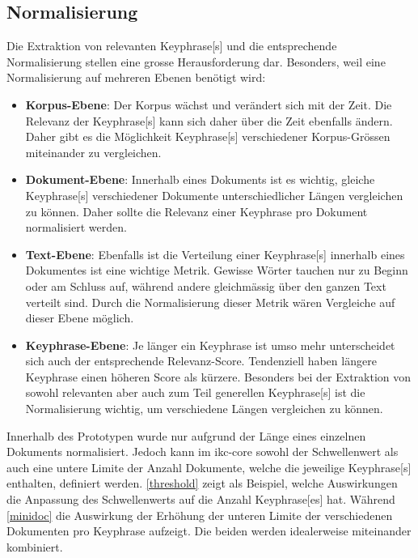 \subsection{Normalisierung}
Die Extraktion von relevanten \gls{Keyphrase}[s] und die entsprechende Normalisierung stellen eine grosse Herausforderung dar. Besonders, weil eine Normalisierung auf mehreren Ebenen benötigt wird:
\begin{itemize}
    \item \textbf{Korpus-Ebene}: Der Korpus wächst und verändert sich mit der Zeit. Die Relevanz der \gls{Keyphrase}[s] kann sich daher über die Zeit ebenfalls ändern. Daher gibt es die Möglichkeit \gls{Keyphrase}[s] verschiedener Korpus-Grössen miteinander zu vergleichen.
    \item \textbf{Dokument-Ebene}: Innerhalb eines Dokuments ist es wichtig, gleiche \gls{Keyphrase}[s] verschiedener Dokumente unterschiedlicher Längen vergleichen zu können. Daher sollte die Relevanz einer \gls{Keyphrase} pro Dokument normalisiert werden.
    \item \textbf{Text-Ebene}: Ebenfalls ist die Verteilung einer \gls{Keyphrase}[s] innerhalb eines Dokumentes ist eine wichtige Metrik. Gewisse Wörter tauchen nur zu Beginn oder am Schluss auf, während andere gleichmässig über den ganzen Text verteilt sind. Durch die Normalisierung dieser Metrik wären Vergleiche auf dieser Ebene möglich.
    \item \textbf{Keyphrase-Ebene}: Je länger ein \gls{Keyphrase} ist umso mehr unterscheidet sich auch der entsprechende Relevanz-Score. Tendenziell haben längere \gls{Keyphrase} einen höheren \gls{Score} als kürzere. Besonders bei der Extraktion von sowohl relevanten aber auch zum Teil generellen \gls{Keyphrase}[s] ist die Normalisierung wichtig, um verschiedene Längen vergleichen zu können.
\end{itemize}

Innerhalb des Prototypen wurde nur aufgrund der Länge eines einzelnen Dokuments normalisiert. Jedoch kann im \gls{ikc-core} sowohl der Schwellenwert als auch eine untere Limite der Anzahl Dokumente, welche die jeweilige \gls{Keyphrase}[s] enthalten, definiert werden. \autoref{threshold} zeigt als Beispiel, welche Auswirkungen die Anpassung des Schwellenwerts auf die Anzahl \gls{Keyphrase}[es] hat. Während \autoref{minidoc} die Auswirkung der Erhöhung der unteren Limite der verschiedenen Dokumenten pro \gls{Keyphrase} aufzeigt. Die beiden werden idealerweise miteinander kombiniert.

